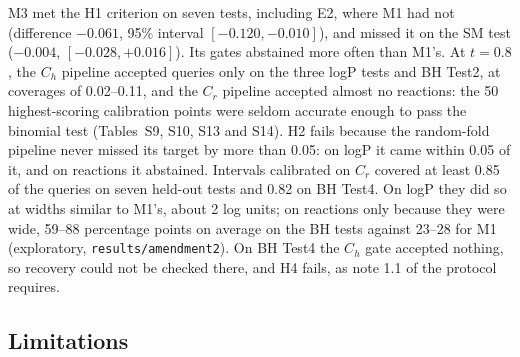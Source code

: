 \documentclass[11pt,letterpaper]{article}
\begin{document}
M3 met the H1 criterion on seven tests, including E2, where M1 had not (difference $-0.061$, 95\% interval $[-0.120, -0.010]$), and missed it on the SM test ($-0.004$, $[-0.028, +0.016]$). Its gates abstained more often than M1's. At $t = 0.8$, the $C_h$ pipeline accepted queries only on the three logP tests and BH Test2, at coverages of 0.02--0.11, and the $C_r$ pipeline accepted almost no reactions: the 50 highest-scoring calibration points were seldom accurate enough to pass the binomial test (Tables~S9, S10, S13 and S14). H2 fails because the random-fold pipeline never missed its target by more than 0.05: on logP it came within 0.05 of it, and on reactions it abstained. Intervals calibrated on $C_r$ covered at least 0.85 of the queries on seven held-out tests and 0.82 on BH Test4. On logP they did so at widths similar to M1's, about 2 log units; on reactions only because they were wide, 59--88 percentage points on average on the BH tests against 23--28 for M1 (exploratory, \texttt{results/amendment2}). On BH Test4 the $C_h$ gate accepted nothing, so recovery could not be checked there, and H4 fails, as note 1.1 of the protocol requires.

\subsection{Limitations}
\label{sec:limits}
\end{document}
